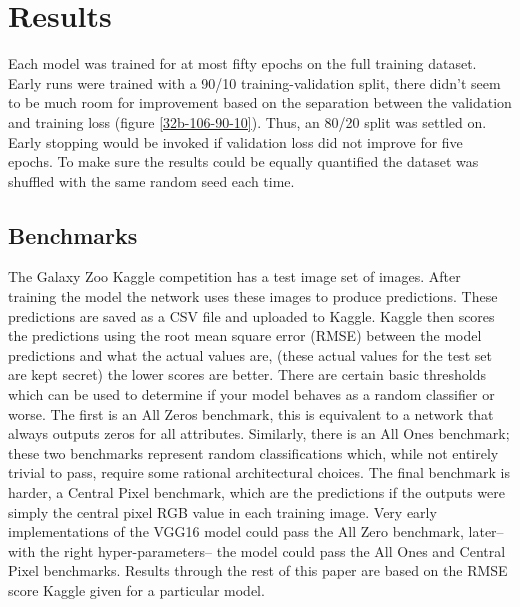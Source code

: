 \section{Results}



Each model was trained for at most fifty epochs on the full training dataset. Early runs were trained with a 90/10 training-validation split, there didn't seem to be much room for improvement based on the separation between the validation and training loss (figure \ref{32b-106-90-10}). Thus, an 80/20 split was settled on. Early stopping would be invoked if validation loss did not improve for five epochs. To make sure the results could be equally quantified the dataset was shuffled with the same random seed each time.

\subsection{Benchmarks}\label{benchmarks}
The Galaxy Zoo Kaggle competition has a test image set of  images. After training the model the network uses these images to produce predictions. These predictions are saved as a CSV file and uploaded to Kaggle. Kaggle then scores the predictions using the root mean square error (RMSE) between the model predictions and what the actual values are, (these actual values for the test set are kept secret) the lower scores are better. There are certain basic thresholds which can be used to determine if your model behaves as a random classifier or worse. The first is an All Zeros benchmark, this is equivalent to a network that always outputs zeros for all attributes. Similarly, there is an All Ones benchmark; these two benchmarks represent random classifications which, while not entirely trivial to pass, require some rational architectural choices. The final benchmark is harder, a Central Pixel benchmark, which are the predictions if the outputs were simply the central pixel RGB value in each training image. Very early implementations of the VGG16 model could pass the All Zero benchmark, later--with the right hyper-parameters-- the model could pass the All Ones and Central Pixel benchmarks. Results through the rest of this paper are based on the RMSE score Kaggle given for a particular model.

